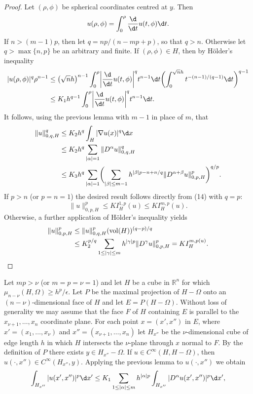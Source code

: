 \begin{proof}
  Let $(\rho,\phi)$ be spherical coordinates centred at $y$. Then
  \[ u(\rho,\phi)  = \int_0^\rho \frac{\d}{\d t} u(t,\phi) \d t. \]
  If $n>(m-1)p$, then let $q = np/(n-mp+p)$, so that $q>n$.
  Otherwise let $q>\max\{n,p\}$ be an arbitrary and finite. If $(\rho,\phi)\in H$,
  then by H\"older's inequality
  \begin{align*}
    |u(\rho,\phi)|^q \rho^{n-1}
    & \leq \bigl(\sqrt n h\bigr)^{n-1} \int_0^\rho \biggl|\frac{\d}{\d t} u(t,\phi)\biggr|^q
      t^{n-1} \d t \biggl(\int_0^{\sqrt n h} t^{-(n-1)/(q-1)} \d t\biggr)^{q-1} \\
    & \leq K_1 h^{q-1} \int_0^\rho \biggl|\frac{\d}{\d t} u(t,\phi)\biggr|^q t^{n-1} \d t.
  \end{align*}
  It follows, using the previous lemma with $m-1$ in place of $m$, that
  \begin{equation}\label{eq:6.14}
    \begin{aligned}
      \|u\|_{0,q,H}^q
      & \leq K_2 h^q \int_H |\nabla u(x)|^q \d x \\
      & \leq K_2 h^q \sum_{|\alpha|=1} \|D^\alpha u\|_{0,q,H}^q \\
      & \leq K_3 h^q \sum_{|\alpha|=1} \biggl(\sum_{|\beta|\leq m-1}
          h^{|\beta|p-n+n/q} \|D^{\alpha+\beta} u\|_{0,p,H}^p \biggr)^{q/p}.
    \end{aligned}
  \end{equation}
  If $p>n$ (or $p=n=1$) the desired result follows directly from (14)
  with $q=p$:
  \[ \|u\|_{0,p,H}^p \leq K I_H^{1,p}(u) \leq K I_H^{m,p}(u). \]
  Otherwise, a further application of H\"older's inequality yields
  \begin{align*}
    \|u\|_{0,p,H}^p
    & \leq \|u\|_{0,q,H}^p (\operatorname{vol}(H))^{(q-p)/q} \\
    & \leq K_2^{p/q} \sum_{1\leq |\gamma|\leq m} h^{|\gamma|p} \|D^\gamma u\|_{0,p,H}^p
        = K I_H^{m,p(u)}. \qedhere
  \end{align*}
\end{proof}


\begin{para}
  Let $mp>\nu$ (or $m=p=\nu=1$) and let $H$ be a cube in $\mathbb{R}^n$ for which
  $\mu_{n-\nu}(H,\Omega)\geq h^p/\epsilon$. Let $P$ be the maximal projection of
  $H-\Omega$ onto an $(n-\nu)$-dimensional face of $H$ and let $E=P(H-\Omega)$.
  Without loss of generality we may assume that the face $F$ of $H$ containing $E$
  is parallel to the $x_{\nu+1},\ldots,x_n$ coordinate plane. For each point
  $x=(x',x'')$ in $E$, where $x' = (x_1,\ldots,x_\nu)$ and $x'' = (x_{\nu+1},\ldots,x_n)$
  let $H_{x''}$ be the $\nu$-dimensional cube of edge length $h$ in which $H$
  intersects the $\nu$-plane through $x$ normal to $F$. By the definition of $P$
  there exists $y\in H_{x''}-\Omega$. If $u\in C^\infty(H,H-\Omega)$,
  then $u(\cdot,x'')\in C^\infty(H_{x''},y)$. Applying the previous lemma to $u(\cdot,x'')$
  we obtain
  \[ \int_{H_{x''}} |u(x',x'')|^p \d x' \leq K_1 \sum_{1\leq |\alpha|\leq m}
      h^{|\alpha|p} \int_{H_{x''}} |D^\alpha u(x',x'')|^p \d x', \]
\end{para}